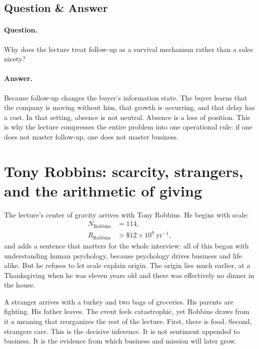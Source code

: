 \subsection{Question \& Answer}

\paragraph{Question.} Why does the lecture treat follow-up as a survival mechanism rather than a sales nicety?

\paragraph{Answer.} Because follow-up changes the buyer's information state. The buyer learns that the company is moving without him, that growth is occurring, and that delay has a cost. In that setting, absence is not neutral. Absence is a loss of position. This is why the lecture compresses the entire problem into one operational rule: if one does not master follow-up, one does not master business.

\section{Tony Robbins: scarcity, strangers, and the arithmetic of giving}

The lecture's center of gravity arrives with Tony Robbins. He begins with scale:
\begin{align}
N_{\text{Robbins}} &= 114,\\
R_{\text{Robbins}} &> \$12\times 10^{9}\ \text{yr}^{-1},
\end{align}
and adds a sentence that matters for the whole interview: all of this began with understanding human psychology, because psychology drives business and life alike. But he refuses to let scale explain origin. The origin lies much earlier, at a Thanksgiving when he was eleven years old and there was effectively no dinner in the house.

A stranger arrives with a turkey and two bags of groceries. His parents are fighting. His father leaves. The event feels catastrophic, yet Robbins draws from it a meaning that reorganizes the rest of the lecture. First, there is food. Second, strangers care. This is the decisive inference. It is not sentiment appended to business. It is the evidence from which business and mission will later grow.

